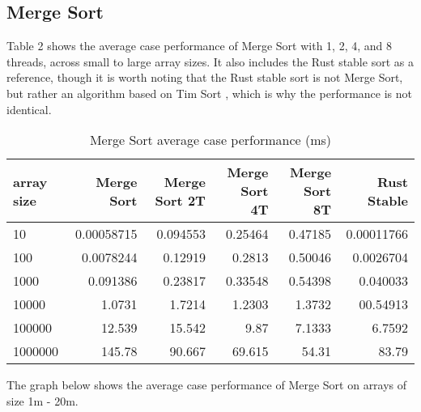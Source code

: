 \documentclass[12pt,letterpaper]{report}
\begin{document}
	\subsection*{Merge Sort}
	
	Table 2 shows the average case performance of Merge Sort with 1, 2, 4, and 8 threads, across small to large array sizes. It also includes the Rust stable sort as a reference, though it is worth noting that the Rust stable sort is not Merge Sort, but rather an algorithm based on Tim Sort \cite{sort_stable}, which is why the performance is not identical.
	
	\begin{table}[H]
  \begin{center}
    \caption{Merge Sort average case performance (ms)}
    \label{tab:table1}
    \begin{tabular}{l|r|r|r|r|r}
      \textbf{array size} & \textbf{Merge Sort} & \textbf{Merge Sort 2T} & \textbf{Merge Sort 4T} & \textbf{Merge Sort 8T} & \textbf{Rust Stable}\\
      \hline
      10 & 0.00058715 & 0.094553 & 0.25464 & 0.47185 & 0.00011766\\
      100 & 0.0078244 & 0.12919 & 0.2813 & 0.50046 & 0.0026704\\
      1000 & 0.091386 & 0.23817 & 0.33548 & 0.54398 & 0.040033\\
      10000 & 1.0731 & 1.7214 & 1.2303 & 1.3732 & 00.54913\\
      100000 & 12.539 & 15.542 & 9.87 & 7.1333 & 6.7592\\
      1000000 & 145.78 & 90.667 & 69.615 & 54.31 & 83.79\\
    \end{tabular}
  \end{center}
\end{table}

 	The graph below shows the average case performance of Merge Sort on arrays of size 1m - 20m.
\end{document}
